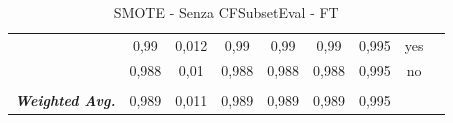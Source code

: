 \begin{table}[htbp]
{\begin{tabular}{rrrrrrrrr}
				\multicolumn{1}{c}{} & \multicolumn{1}{c}{0,99} & \multicolumn{1}{c}{0,012} & \multicolumn{1}{c}{0,99} & \multicolumn{1}{c}{0,99} & \multicolumn{1}{c}{0,99} & \multicolumn{1}{c}{0,995} & \multicolumn{1}{c}{yes} &  \\
				\multicolumn{1}{c}{} & \multicolumn{1}{c}{0,988} & \multicolumn{1}{c}{0,01} & \multicolumn{1}{c}{0,988} & \multicolumn{1}{c}{0,988} & \multicolumn{1}{c}{0,988} & \multicolumn{1}{c}{0,995} & \multicolumn{1}{c}{no} &  \\
				\multicolumn{1}{c}{} & \multicolumn{1}{c}{} & \multicolumn{1}{c}{} & \multicolumn{1}{c}{} & \multicolumn{1}{c}{} & \multicolumn{1}{c}{} & \multicolumn{1}{c}{} & \multicolumn{1}{c}{} &  \\
				\multicolumn{1}{c}{\textit{\textbf{Weighted Avg.}}} & \multicolumn{1}{c}{0,989} & \multicolumn{1}{c}{0,011} & \multicolumn{1}{c}{0,989} & \multicolumn{1}{c}{0,989} & \multicolumn{1}{c}{0,989} & \multicolumn{1}{c}{0,995} & \multicolumn{1}{c}{} &  \\
			\end{tabular}%
	}
	\label{tab:FTExtend}%
	\caption{ SMOTE - Senza CFSubsetEval - FT}
\end{table}%

